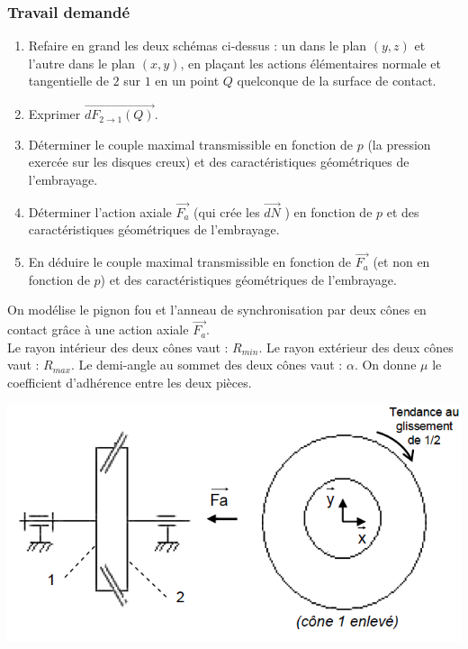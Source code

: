 \subsubsection{Travail demandé}
\begin{enumerate}
\item Refaire en grand les deux schémas ci-dessus : un dans le plan $(y, z)$ et l’autre dans le plan $(x, y)$, en plaçant les actions élémentaires normale et tangentielle de $2$ sur $1$ en un point $Q$ quelconque de la surface de contact.
\item Exprimer $\overrightarrow{dF_{2\rightarrow1}(Q)}$.
\item Déterminer le couple maximal transmissible en fonction de $p$ (la pression exercée sur les disques creux) et des caractéristiques géométriques de l’embrayage.
\item Déterminer l’action axiale $\overrightarrow{F_a}$ (qui crée les $\overrightarrow{dN}$ ) en fonction de $p$ et des caractéristiques géométriques de l’embrayage.
\item En déduire le couple maximal transmissible en fonction de $\overrightarrow{F_a}$ (et non en fonction de $p$) et des caractéristiques géométriques de l’embrayage.
\end{enumerate}

\newpage



On modélise le pignon fou et l'anneau de synchronisation par deux cônes en contact grâce à une action axiale $\overrightarrow{F_a}$.\\
Le rayon intérieur des deux cônes vaut : $R_{min}$. Le rayon extérieur des deux cônes vaut : $R_{max}$. Le demi-angle au sommet des deux cônes vaut : $\alpha$. On donne $\mu$ le coefficient d'adhérence entre
les deux pièces.

\begin{center}
\includegraphics[scale=0.5]{png/embrayage2.png}
\end{center}

